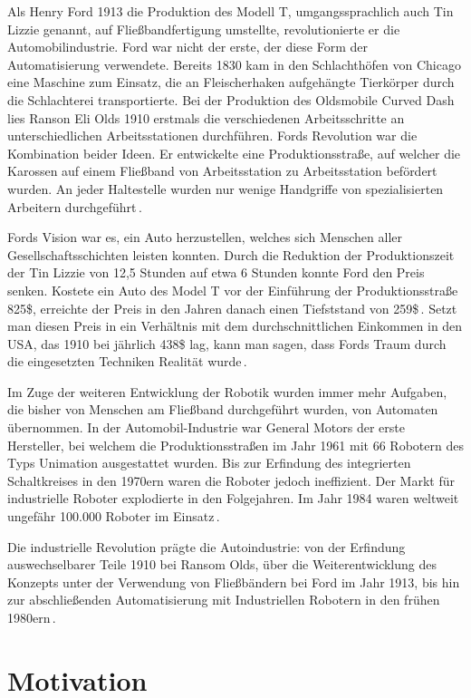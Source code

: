\documentclass[12pt,oneside,a4paper,parskip]{scrbook}
\begin{document}
Als Henry Ford 1913 die Produktion des Modell T, umgangssprachlich auch Tin Lizzie genannt, auf Fließbandfertigung umstellte, revolutionierte er die Automobilindustrie. Ford war nicht der erste, der diese Form der Automatisierung verwendete. Bereits 1830 kam in den Schlachthöfen von Chicago eine Maschine zum Einsatz, die an Fleischerhaken aufgehängte Tierkörper durch die Schlachterei transportierte. Bei der Produktion des Oldsmobile Curved Dash lies Ranson Eli Olds 1910 erstmals die verschiedenen Arbeitsschritte an unterschiedlichen Arbeitsstationen durchführen. Fords Revolution war die Kombination beider Ideen. Er entwickelte eine Produktionsstraße, auf welcher die Karossen auf einem Fließband von Arbeitsstation zu Arbeitsstation befördert wurden. An jeder Haltestelle wurden nur wenige Handgriffe von spezialisierten Arbeitern durchgeführt\,\cite{sagerso2008}.

Fords Vision war es, ein Auto herzustellen, welches sich Menschen aller Gesellschaftsschichten leisten konnten. Durch die Reduktion der Produktionszeit der Tin Lizzie von 12,5 Stunden auf etwa 6 Stunden konnte Ford den Preis senken. Kostete ein Auto des Model T vor der Einführung der Produktionsstraße 825\$, erreichte der Preis in den Jahren danach einen Tiefststand von 259\$\,\cite{reichlesz2010}. Setzt man diesen Preis in ein Verhältnis mit dem durchschnittlichen Einkommen in den USA, das 1910 bei jährlich 438\$ lag, kann man sagen, dass Fords Traum durch die eingesetzten Techniken Realität wurde\,\cite{usembassyodnumbers}.

Im Zuge der weiteren Entwicklung der Robotik wurden immer mehr Aufgaben, die bisher von Menschen am Fließband durchgeführt wurden, von Automaten übernommen. In der Automobil-Industrie war General Motors der erste Hersteller, bei welchem die Produktionsstraßen im Jahr 1961 mit 66 Robotern des Typs Unimation ausgestattet wurden. Bis zur Erfindung des integrierten Schaltkreises in den 1970ern waren die Roboter jedoch ineffizient. Der Markt für industrielle Roboter explodierte in den Folgejahren. Im Jahr 1984 waren weltweit ungefähr 100.000 Roboter im Einsatz\,\cite{czaeis2000, wallen2008}.

Die industrielle Revolution prägte die Autoindustrie: von der Erfindung auswechselbarer Teile 1910 bei Ransom Olds, über die Weiterentwicklung des Konzepts unter der Verwendung von Fließbändern bei Ford im Jahr 1913, bis hin zur abschließenden Automatisierung mit Industriellen Robotern in den frühen 1980ern\,\cite{czaeis2000}.

\section{Motivation}
\end{document}
